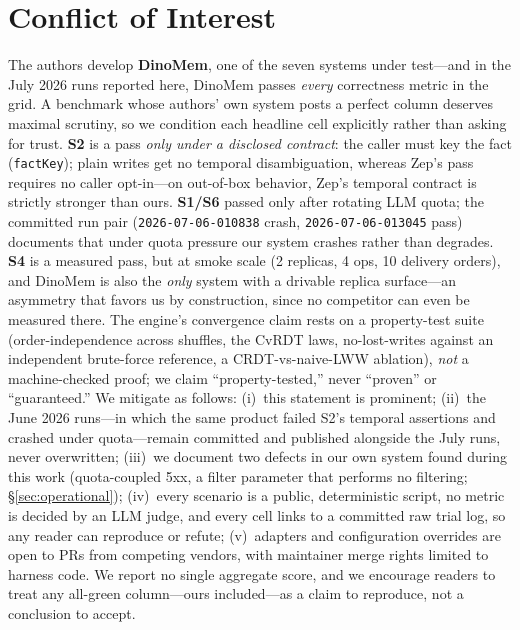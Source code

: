 \documentclass[11pt]{article}
\begin{document}
\section{Conflict of Interest}\label{sec:coi}
The authors develop \textbf{DinoMem}, one of the seven systems under test---and in
the July 2026 runs reported here, DinoMem passes \emph{every} correctness metric in
the grid. A benchmark whose authors' own system posts a perfect column deserves
maximal scrutiny, so we condition each headline cell explicitly rather than asking
for trust. \textbf{S2} is a pass \emph{only under a disclosed contract}: the caller
must key the fact (\texttt{factKey}); plain writes get no temporal disambiguation,
whereas Zep's pass requires no caller opt-in---on out-of-box behavior, Zep's
temporal contract is strictly stronger than ours. \textbf{S1/S6} passed only after
rotating LLM quota; the committed run pair (\texttt{2026-07-06-010838} crash,
\texttt{2026-07-06-013045} pass) documents that under quota pressure our system
crashes rather than degrades. \textbf{S4} is a measured pass, but at smoke scale
(2 replicas, 4 ops, 10 delivery orders), and DinoMem is also the \emph{only} system
with a drivable replica surface---an asymmetry that favors us by construction, since
no competitor can even be measured there. The engine's convergence claim rests on a
property-test suite (order-independence across shuffles, the CvRDT laws,
no-lost-writes against an independent brute-force reference, a CRDT-vs-naive-LWW
ablation), \emph{not} a machine-checked proof; we claim ``property-tested,'' never
``proven'' or ``guaranteed.'' We mitigate as follows: (i)~this statement is
prominent; (ii)~the June 2026 runs---in which the same product failed S2's temporal
assertions and crashed under quota---remain committed and published alongside the
July runs, never overwritten; (iii)~we document two defects in our own system found
during this work (quota-coupled 5xx, a filter parameter that performs no filtering;
\S\ref{sec:operational}); (iv)~every scenario is a public, deterministic script, no
metric is decided by an LLM judge, and every cell links to a committed raw trial
log, so any reader can reproduce or refute; (v)~adapters and configuration
overrides are open to PRs from competing vendors, with maintainer merge rights
limited to harness code. We report no single aggregate score, and we encourage
readers to treat any all-green column---ours included---as a claim to reproduce,
not a conclusion to accept.
\end{document}
